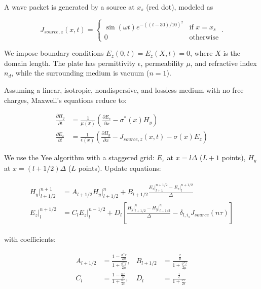 \documentclass[11pt, A4paper]{article}
\begin{document}
A wave packet is generated by a source at $x_s$ (red dot), modeled as

\begin{equation}
    J_{source,z}(x,t) = \begin{cases}
        \sin(\omega t) e ^{-((t-30)/10)^2} & \text{if } x = x_s\\
        0 & \text{otherwise}
    \end{cases}.
    \label{eq: current}
\end{equation}

We impose boundary conditions $E_z(0,t) = E_z(X,t) = 0$, where $X$ is the domain length. The plate has permittivity $\epsilon$, permeability $\mu$, and refractive index $n_d$, while the surrounding medium is vacuum ($n=1$).

Assuming a linear, isotropic, nondispersive, and lossless medium with no free charges, Maxwell's equations reduce to:

\begin{align*}
\frac{\partial H_y}{\partial t} &= \frac{1}{\mu(x)}\left(\frac{\partial E_z}{\partial x} - \sigma^*(x) H_y\right)\\
\frac{\partial E_z}{\partial t} &= \frac{1}{\epsilon(x)}\left(\frac{\partial H_y}{\partial x} - J_{source,z}(x,t) - \sigma(x)E_z\right)
\end{align*}

We use the Yee algorithm with a staggered grid: $E_z$ at $x = l\Delta$ ($L+1$ points), $H_y$ at $x = (l+1/2)\Delta$ ($L$ points). Update equations:

\begin{align}
\begin{split}
H_y \Big|^{n+1}_{l+1/2} &= A_{l+1/2} H_y \Big|^{n}_{l+1/2} + B_{l+1/2} \frac{E_z \Big|^{n+1/2}_{l+1} - E_z \Big|^{n+1/2}_l}{\Delta} \\
E_z\Big|^{n+1/2}_l &= C_l E_z\Big|^{n-1/2}_l + D_l \left[\frac{H_y\Big|^n_{l+1/2} - H_y\Big|^n_{l-1/2}}{\Delta} - \delta_{l,i_s} J_{source}(n\tau)\right]
\end{split}
\label{eq: update_E_H}
\end{align}

with coefficients:

\begin{align*}
A_{l+1/2} &= \frac{1 - \frac{\sigma^* \tau}{2\mu}}{1 + \frac{\sigma^* \tau}{2\mu}}, &
B_{l+1/2} &= \frac{\frac{\tau}{\mu}}{1 + \frac{\sigma^* \tau}{2\mu}} \\
C_l &= \frac{1 - \frac{\sigma \tau}{2\epsilon}}{1 + \frac{\sigma \tau}{2\epsilon}}, &
D_l &= \frac{\frac{\tau}{\epsilon}}{1 + \frac{\sigma \tau}{2\epsilon}}
\end{align*}
\end{document}
